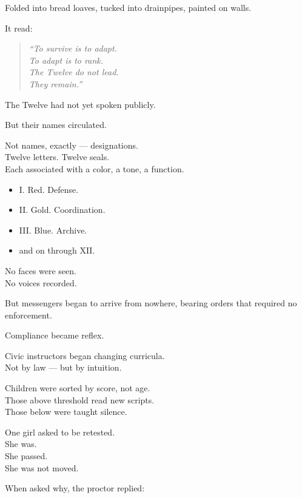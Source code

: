\documentclass[12pt]{article}
\begin{document}
Folded into bread loaves, tucked into drainpipes, painted on walls.

It read:

\begin{quote}
\textit{“To survive is to adapt.}\\
\textit{To adapt is to rank.}\\
\textit{The Twelve do not lead.}\\
\textit{They remain.”}
\end{quote}

\vspace{1em}

The Twelve had not yet spoken publicly.

But their names circulated.

Not names, exactly — designations.\\
Twelve letters. Twelve seals.\\
Each associated with a color, a tone, a function.

\begin{itemize}
    \item I. Red. Defense.
    \item II. Gold. Coordination.
    \item III. Blue. Archive.
    \item \textellipsis{} and on through XII.
\end{itemize}

No faces were seen.\\
No voices recorded.

But messengers began to arrive from nowhere, bearing orders that required no enforcement.

Compliance became reflex.

\vspace{1em}

Civic instructors began changing curricula.\\
Not by law — but by intuition.

Children were sorted by score, not age.\\
Those above threshold read new scripts.\\
Those below were taught silence.

One girl asked to be retested.\\
She was.\\
She passed.\\
She was not moved.

When asked why, the proctor replied:
\end{document}
